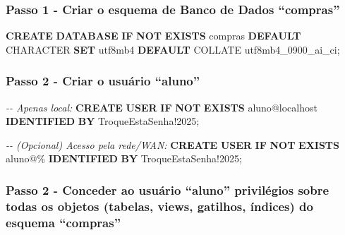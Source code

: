 \documentclass[
]{book}
\newenvironment{Shaded}{\begin{snugshade}}{\end{snugshade}}
\newcommand{\CommentTok}[1]{\textcolor[rgb]{0.56,0.35,0.01}{\textit{#1}}}
\newcommand{\ControlFlowTok}[1]{\textcolor[rgb]{0.13,0.29,0.53}{\textbf{#1}}}
\newcommand{\DataTypeTok}[1]{\textcolor[rgb]{0.13,0.29,0.53}{#1}}
\newcommand{\FunctionTok}[1]{\textcolor[rgb]{0.13,0.29,0.53}{\textbf{#1}}}
\newcommand{\KeywordTok}[1]{\textcolor[rgb]{0.13,0.29,0.53}{\textbf{#1}}}
\newcommand{\NormalTok}[1]{#1}
\newcommand{\StringTok}[1]{\textcolor[rgb]{0.31,0.60,0.02}{#1}}
\begin{document}
\subsubsection{Passo 1 - Criar o esquema de Banco de Dados ``compras''}\label{passo-1---criar-o-esquema-de-banco-de-dados-compras}

\begin{Shaded}
\begin{Highlighting}[]
\KeywordTok{CREATE} \KeywordTok{DATABASE} \ControlFlowTok{IF} \KeywordTok{NOT} \KeywordTok{EXISTS}\NormalTok{ compras}
  \KeywordTok{DEFAULT} \DataTypeTok{CHARACTER} \KeywordTok{SET}\NormalTok{ utf8mb4}
  \KeywordTok{DEFAULT}\NormalTok{ COLLATE utf8mb4\_0900\_ai\_ci;}
\end{Highlighting}
\end{Shaded}

\subsubsection{Passo 2 - Criar o usuário ``aluno''}\label{passo-2---criar-o-usuuxe1rio-aluno}

\begin{Shaded}
\begin{Highlighting}[]
\CommentTok{{-}{-} Apenas local:}
\KeywordTok{CREATE} \FunctionTok{USER} \ControlFlowTok{IF} \KeywordTok{NOT} \KeywordTok{EXISTS} \StringTok{\textquotesingle{}aluno\textquotesingle{}}\NormalTok{@}\StringTok{\textquotesingle{}localhost\textquotesingle{}} \KeywordTok{IDENTIFIED} \KeywordTok{BY} \StringTok{\textquotesingle{}TroqueEstaSenha!2025\textquotesingle{}}\NormalTok{;}

\CommentTok{{-}{-} (Opcional) Acesso pela rede/WAN:}
\KeywordTok{CREATE} \FunctionTok{USER} \ControlFlowTok{IF} \KeywordTok{NOT} \KeywordTok{EXISTS} \StringTok{\textquotesingle{}aluno\textquotesingle{}}\NormalTok{@}\StringTok{\textquotesingle{}\%\textquotesingle{}} \KeywordTok{IDENTIFIED} \KeywordTok{BY} \StringTok{\textquotesingle{}TroqueEstaSenha!2025\textquotesingle{}}\NormalTok{;}
\end{Highlighting}
\end{Shaded}

\subsubsection{Passo 2 - Conceder ao usuário ``aluno'' privilégios sobre todas os objetos (tabelas, views, gatilhos, índices) do esquema ``compras''}\label{passo-2---conceder-ao-usuuxe1rio-aluno-priviluxe9gios-sobre-todas-os-objetos-tabelas-views-gatilhos-uxedndices-do-esquema-compras}
\end{document}
